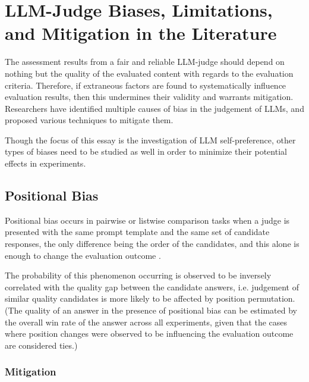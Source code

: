 \documentclass[UTF8,noindent,nohyp,parspace,titlepage,a4paper,12pt]{article}
\begin{document}
\clearpage

  \section{LLM-Judge Biases, Limitations, and Mitigation in the Literature}

    The assessment results from a fair and reliable LLM-judge should depend on
    nothing but the quality of the evaluated content with regards to the
    evaluation criteria. Therefore, if extraneous factors are found to
    systematically influence evaluation results, then this undermines their
    validity and warrants mitigation. Researchers have identified multiple
    causes of bias in the judgement of LLMs, and proposed various techniques
    to mitigate them.

    Though the focus of this essay is the investigation of LLM self-preference,
    other types of biases need to be studied as well in order to minimize their
    potential effects in experiments.

    \subsection{Positional Bias}

      Positional bias occurs in pairwise or listwise comparison tasks when a
      judge is presented with the same prompt template and the same set of
      candidate responses, the only difference being the order of the candidates,
      and this alone is enough to change the evaluation outcome
      \cite{biaspos,notfair}.

      The probability of this phenomenon occurring is observed to be inversely
      correlated with the quality gap between the candidate answers, i.e.
      judgement of similar quality candidates is more likely to be affected by
      position permutation. (The quality of an answer in the presence of
      positional bias can be estimated by the overall win rate of the answer
      across all experiments, given that the cases where position changes
      were observed to be influencing the evaluation outcome are considered
      ties.)

      \subsubsection{Mitigation}
\end{document}
